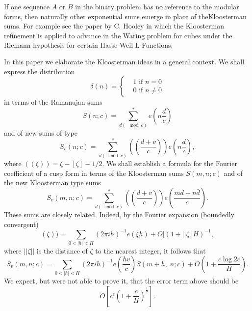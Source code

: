 If one sequence $A$ or $B$ in the binary problem has no reference to the modular forms, then naturally other exponential sums emerge in place of the\pageoriginale Kloosterman sums. For example see the paper by C. Hooley \cite{art6-key3} in which the Kloosterman refinement is applied to advance in the Waring problem for cubes under the Riemann hypothesis for certain Hasse-Weil L-Functions.

In this paper we elaborate the Kloosterman ideas in a general context. We shall express the distribution
$$
\delta(n) = 
\left\{
\begin{aligned}
& 1 \text{ if } n = 0\\
& 0 \text{ if } n \neq 0 
\end{aligned}
 \right.
$$
in terms of the Ramanujan sums
$$
S(n;c) =\sum\limits^\ast_{d(\mod c)} e \left(n \frac{d}{c} \right)
$$
and of new sums of type
$$
S_v (n; c) = \sum\limits^\ast_{d (\mod c)} \left(\left(\frac{d+v}{c} \right) \right) e \left(n \frac{d}{c} \right),
$$
where $((\zeta)) = \zeta - [\zeta] - 1/2$. We shall establish a formula for the Fourier coefficient of a cusp form in terms of the Kloosterman sums $S(m,n;c)$ and of the new Kloosterman type sums
$$
S_v (m, n;c) = \sum\limits^\ast_{d(\mod c)} \left(\left(\frac{d+v}{c} \right) \right) e \left(\frac{md+n\bar{d}}{c} \right). 
$$
These sums are closely related. Indeed, by the Fourier expansion (boundedly convergent)
$$ 
(\zeta)) = \sum\limits_{0 < |h| < H} (2 \pi i h)^{-1} e (\xi h) + O [(1+ ||\zeta|| H)^{-1},
$$
where $||\zeta||$ is the distance of $\zeta$ to the nearest integer, it follows that
$$
S_v (m, n; c) = \sum\limits_{0 <|h| < H} (2\pi i h)^{-1} e \left(\frac{hv}{c} \right) S (m+h,\; n; c) + O \left(1+ \frac{c \log 2 c}{H} \right).
$$
We expect, but were not able to prove it, that the error term above should be 
$$
O\left[c^\epsilon \left(1+ \frac{c}{H} \right)^{\frac{1}{2}} \right].
$$

